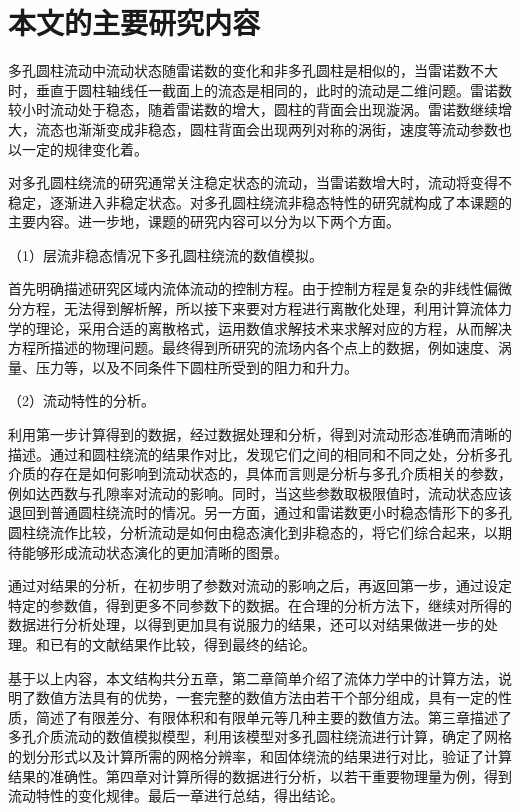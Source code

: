 \section{本文的主要研究内容}


多孔圆柱流动中流动状态随雷诺数的变化和非多孔圆柱是相似的，当雷诺数不大时，垂直于圆柱轴线任一截面上的流态是相同的，此时的流动是二维问题。雷诺数较小时流动处于稳态，随着雷诺数的增大，圆柱的背面会出现漩涡。雷诺数继续增大，流态也渐渐变成非稳态，圆柱背面会出现两列对称的涡街，速度等流动参数也以一定的规律变化着。

对多孔圆柱绕流的研究通常关注稳定状态的流动，当雷诺数增大时，流动将变得不稳定，逐渐进入非稳定状态。对多孔圆柱绕流非稳态特性的研究就构成了本课题的主要内容。进一步地，课题的研究内容可以分为以下两个方面。

（1）层流非稳态情况下多孔圆柱绕流的数值模拟。

首先明确描述研究区域内流体流动的控制方程。由于控制方程是复杂的非线性偏微分方程，无法得到解析解，所以接下来要对方程进行离散化处理，利用计算流体力学的理论，采用合适的离散格式，运用数值求解技术来求解对应的方程，从而解决方程所描述的物理问题。最终得到所研究的流场内各个点上的数据，例如速度、涡量、压力等，以及不同条件下圆柱所受到的阻力和升力。

（2）流动特性的分析。

利用第一步计算得到的数据，经过数据处理和分析，得到对流动形态准确而清晰的描述。通过和圆柱绕流的结果作对比，发现它们之间的相同和不同之处，分析多孔介质的存在是如何影响到流动状态的，具体而言则是分析与多孔介质相关的参数，例如达西数与孔隙率对流动的影响。同时，当这些参数取极限值时，流动状态应该退回到普通圆柱绕流时的情况。另一方面，通过和雷诺数更小时稳态情形下的多孔圆柱绕流作比较，分析流动是如何由稳态演化到非稳态的，将它们综合起来，以期待能够形成流动状态演化的更加清晰的图景。

通过对结果的分析，在初步明了参数对流动的影响之后，再返回第一步，通过设定特定的参数值，得到更多不同参数下的数据。在合理的分析方法下，继续对所得的数据进行分析处理，以得到更加具有说服力的结果，还可以对结果做进一步的处理。和已有的文献结果作比较，得到最终的结论。

基于以上内容，本文结构共分五章，第二章简单介绍了流体力学中的计算方法，说明了数值方法具有的优势，一套完整的数值方法由若干个部分组成，具有一定的性质，简述了有限差分、有限体积和有限单元等几种主要的数值方法。第三章描述了多孔介质流动的数值模拟模型，利用该模型对多孔圆柱绕流进行计算，确定了网格的划分形式以及计算所需的网格分辨率，和固体绕流的结果进行对比，验证了计算结果的准确性。第四章对计算所得的数据进行分析，以若干重要物理量为例，得到流动特性的变化规律。最后一章进行总结，得出结论。
